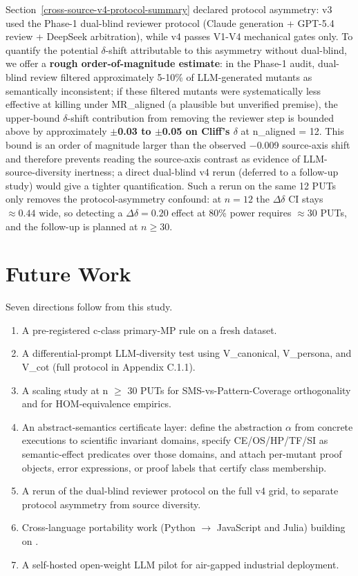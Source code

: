 \documentclass[manuscript,screen,review]{acmart}
\begin{document}
Section~\ref{cross-source-v4-protocol-summary} declared protocol asymmetry: v3 used the Phase-1 dual-blind
reviewer protocol (Claude generation + GPT-5.4 review + DeepSeek
arbitration), while v4 passes V1-V4 mechanical gates only. To quantify
the potential $\delta$-shift attributable to this asymmetry without dual-blind,
we offer a \textbf{rough order-of-magnitude estimate}: in the Phase-1
audit, dual-blind review filtered approximately 5-10\% of LLM-generated
mutants as semantically inconsistent; if these filtered mutants were
systematically less effective at killing under MR\_aligned (a plausible
but unverified premise), the upper-bound $\delta$-shift contribution from
removing the reviewer step is bounded above by approximately
\textbf{$\pm$0.03 to $\pm$0.05 on Cliff's $\delta$} at n\_aligned = 12. This bound is
an order of magnitude larger than the observed $-$0.009 source-axis shift
and therefore prevents reading the source-axis contrast as evidence of
LLM-source-diversity inertness; a direct dual-blind v4 rerun (deferred
to a follow-up study) would give a tighter quantification. Such a rerun
on the same 12 PUTs only removes the protocol-asymmetry confound: at
$n = 12$ the $\Delta\delta$ CI stays $\approx 0.44$ wide, so detecting a
$\Delta\delta = 0.20$ effect at 80\% power requires $\approx 30$ PUTs,
and the follow-up is planned at $n \geq 30$.


\section{Future Work}\label{future-work-and-p-series-roadmap}

Seven directions follow from this study.

\begin{enumerate}
\item
  A pre-registered c-class primary-MP rule on a fresh dataset.
\item
  A differential-prompt LLM-diversity test using V\_canonical,
  V\_persona, and V\_cot (full protocol in Appendix C.1.1).
\item
  A scaling study at n $\geq$ 30 PUTs for SMS-vs-Pattern-Coverage
  orthogonality and for HOM-equivalence empirics.
\item
  An abstract-semantics certificate layer: define the abstraction
  $\alpha$ from concrete executions to scientific invariant domains,
  specify CE/OS/HP/TF/SI as semantic-effect predicates over those
  domains, and attach per-mutant proof objects, error expressions, or
  proof labels that certify class membership.
\item
  A rerun of the dual-blind reviewer protocol on the full v4 grid, to
  separate protocol asymmetry from source diversity.
\item
  Cross-language portability work (Python $\to$ JavaScript and Julia)
  building on \citet{tip2025llmorpheus}.
\item
  A self-hosted open-weight LLM pilot for air-gapped industrial
  deployment.
\end{enumerate}
\end{document}
